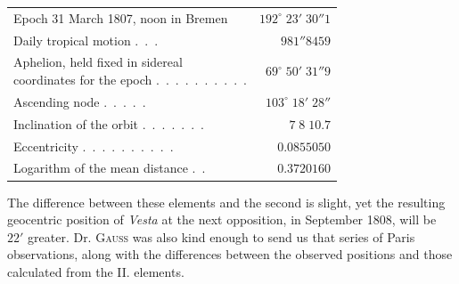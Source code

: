 \begin{center}\begin{tabular}{lr}
Epoch 31 March 1807, noon in Bremen  & $192^\circ\;23'\;30''1$ \\
Daily tropical motion .\ .\ . & $981''8459$ \\
\shortstack[l]{Aphelion, held fixed in sidereal\\coordinates for the epoch} .\ .\ .\ .\ .\ .\ .\ .\ .\ . & $69^\circ\;50'\;31''9$ \\
Ascending node .\ .\ .\ .\ . & $103^\circ\;18'\;28''$ \\
Inclination of the orbit .\ .\ .\ .\ .\ .\ . & $7\;8\;10.7$ \\
Eccentricity .\ .\ .\ .\ .\ .\ .\ .\ .\ . & $0.0855050$ \\
Logarithm of the mean distance .\ . & $0.3720160$ \\
\end{tabular}\end{center}
\par\indent The difference between these elements and the second is slight, yet the resulting geocentric position of \emph{Vesta} at the next opposition, in September 1808, will be $22'$ greater. Dr. \textsc{Gauss} was also kind enough to send us that series of Paris observations, along with the differences between the observed positions and those calculated from the II. elements.

